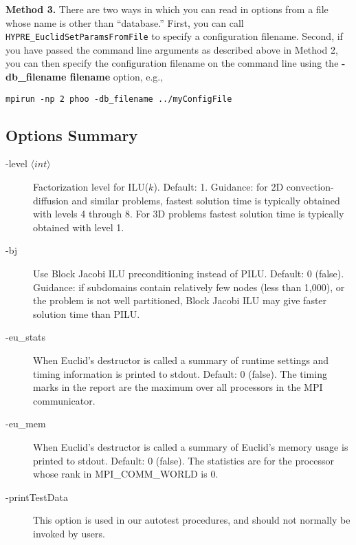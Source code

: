 {\bf Method 3.}
There are two ways in which you can read in options from a file
whose name is other than ``database.''
First, you can call {\tt HYPRE\_EuclidSetParamsFromFile}
to specify a configuration filename.
Second, if you have passed the command line arguments as 
described above in Method 2, 
you can then specify the configuration filename on the command
line using the {\bf -db\_filename filename} option, e.g.,

\begin{display}
\begin{verbatim}
mpirun -np 2 phoo -db_filename ../myConfigFile
\end{verbatim}
\end{display}


\subsection{Options Summary}

\begin{description}
\item[-level $\langle int \rangle$] Factorization level for ILU($k$).  
           Default: 1.
           Guidance: for 2D convection-diffusion and similar problems, 
           fastest solution time is typically obtained with levels 4 through
           8.  For 3D problems fastest solution time is typically 
           obtained with level 1.
                    
\item[-bj] Use Block Jacobi ILU preconditioning instead of PILU.
           Default: 0 (false). Guidance: if subdomains contain
           relatively few nodes (less than 1,000), or the problem is
           not well partitioned, Block Jacobi ILU 
           may give faster solution time than PILU.
\item[-eu\_stats] When Euclid's destructor is called a summary of
                 runtime settings and timing information is printed
                 to stdout.  Default: 0 (false).
                 The timing marks in the report are the maximum over 
                 all processors in the MPI communicator.
\item[-eu\_mem] When Euclid's destructor is called a summary of
               Euclid's memory usage is printed to stdout.
               Default: 0 (false).
               The statistics are for the processor whose rank 
               in MPI\_COMM\_WORLD is 0.
\item[-printTestData] This option is used in our autotest procedures,
                 and should not normally be invoked by users.
\end{description}

